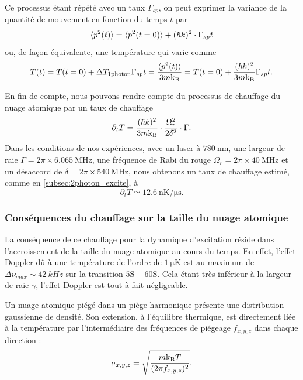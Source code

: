 Ce processus étant répété avec un taux $\Gamma_{sp}$, on peut exprimer la variance de la quantité de mouvement en fonction du temps $t$ par
\begin{equation}
\label{eq:momentum_randomwalk}
\braket{p^2 (t)} = \braket{p^2(t=0)} + (\hbar k)^2 \cdot \Gamma_{sp}t
\end{equation}
ou, de façon équivalente, une température qui varie comme
\begin{equation}
\label{eq:heating_randomwalk}
T(t) = T(t=0) + \Delta T_{\text{1photon}}\Gamma_{sp}t = \frac{\braket{p^2 (t)}}{3m\mathrm{k_B}} =
T(t=0) + \frac{(\hbar k)^2}{3m\mathrm{k_B}} \Gamma_{sp} t.
\end{equation}

En fin de compte, nous pouvons rendre compte du processus de chauffage du nuage atomique par un taux de chauffage
\begin{equation}
\label{eq:heating_rate}
\partial_t T = \frac{(\hbar k)^2}{3m\mathrm{k_B}} \cdot \frac{\Omega_r^2}{2\delta^2} \cdot \Gamma.
\end{equation}
Dans les conditions de nos expériences, avec un laser à $\SI{780}{\nano\meter}$, une largeur de raie $\Gamma = 2\pi\times \SI{6.065}{\MHz}$, une fréquence de Rabi du rouge $\Omega_r = 2\pi\times \SI{40}{\MHz}$ et un désaccord de $\delta = 2\pi \times \SI{540}{\MHz}$, nous obtenons un taux de chauffage estimé, comme en \ref{subsec:2photon_excite}, à
\begin{equation}
\label{heating_rate_value}
\partial_t T \simeq \SI{12.6}{\nano\K / \micro\second}.
\end{equation}

\subsubsection*{Conséquences du chauffage sur la taille du nuage atomique}
\noindent La conséquence de ce chauffage pour la dynamique d'excitation réside dans l'accroissement de la taille du nuage atomique au cours du temps.
En effet, l'effet Doppler dû à une température de l'ordre de $\SI{1}{\micro\kelvin}$ est au maximum de $\Delta \nu_{max} \sim \SI{42}{kHz}$ sur la transition $\mathrm{5S-60S}$.
Cela étant très inférieur à la largeur de raie $\gamma$, l'effet Doppler est tout à fait négligeable. %

Un nuage atomique piégé dans un piège harmonique présente une distribution gaussienne de densité.
Son extension, à l'équilibre thermique, est directement liée à la température par l'intermédiaire des fréquences de piégeage $f_{x,y,z}$ dans chaque direction :
\begin{equation}
\label{eq:trap_size_temp}
\sigma_{x,y,z} = \sqrt{\frac{m\mathrm{k_B} T}{(2\pi f_{x,y,z})^2}}.
\end{equation}


